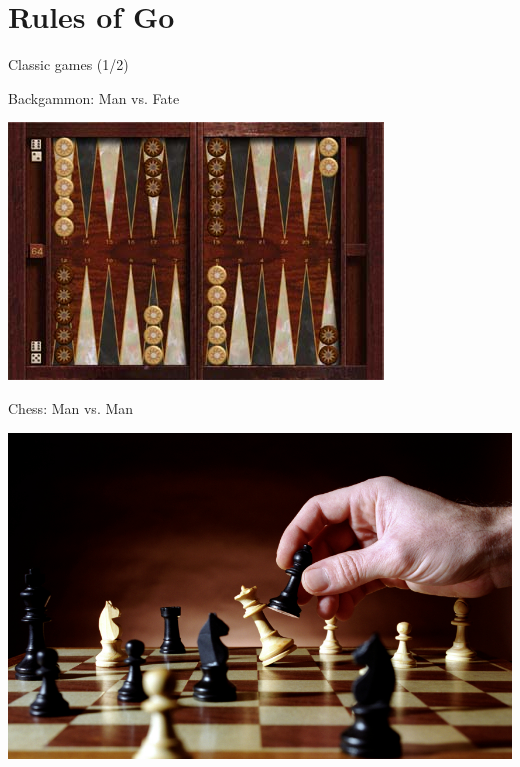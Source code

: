 \documentclass{beamer}
\begin{document}
  \section{Rules of Go}
  \begin{frame}{Classic games (1/2)}
    \pause
    \begin{center}
      \tiny
      Backgammon: Man vs. Fate

      \includegraphics[height=.4\textheight]{../img/backgammon.jpg}
      \pause

      Chess: Man vs. Man

      \includegraphics[height=.4\textheight]{../img/chess.jpg}
    \end{center}
  \end{frame}
\end{document}
